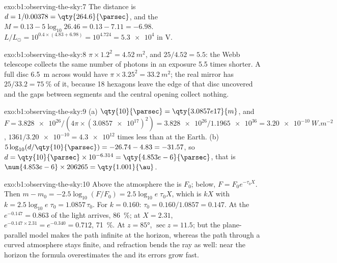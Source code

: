 \begin{solution}{exo:b1:observing-the-sky:7}
The distance is $d = 1/0.00378 = \qty{264.6}{\parsec}$, and the  $M = 0.13 - 5\log_{10}26.46 = 0.13 - 7.11 = -6.98$. $L/L_\odot = 10^{0.4\times(4.83 + 6.98)} =
10^{4.724} = \num{5.3e4}$ in V.
\end{solution}

\begin{solution}{exo:b1:observing-the-sky:8}
$\pi\times1.2^2 = \qty{4.52}{m^2}$, and $25/4.52 = 5.5$: the Webb telescope
collects the same number of photons in an exposure 5.5 times shorter. A full
disc \qty{6.5}{m} across would have $\pi\times3.25^2 = \qty{33.2}{m^2}$; the
real mirror has $25/33.2 = \qty{75}{\percent}$ of it, because 18 hexagons
leave the edge of that disc uncovered and the gaps between segments and the
central opening collect nothing.
\end{solution}

\begin{solution}{exo:b1:observing-the-sky:9}
(a) $\qty{10}{\parsec} = \qty{3.0857e17}{m}$, and $F = \num{3.828e26}/(4\pi
\times(\num{3.0857e17})^2) = \num{3.828e26}/\num{1.1965e36} =
\qty{3.20e-10}{W.m^{-2}}$, $1361/\num{3.20e-10} = \num{4.3e12}$ times less than at
the Earth.
(b) $5\log_{10}(d/\qty{10}{\parsec}) = -26.74 - 4.83 = -31.57$, so
$d = \qty{10}{\parsec}\times10^{-6.314} = \qty{4.853e-6}{\parsec}$, that is
$\num{4.853e-6}\times206265 = \qty{1.001}{\au}$.
\end{solution}

\begin{solution}{exo:b1:observing-the-sky:10}
Above the atmosphere the  is $F_0$; below, $F = F_0e^{-\tau_0X}$. Then
$m - m_0 = -2.5\log_{10}(F/F_0) = 2.5\log_{10}e\;\tau_0X$, which is $kX$ with
$k = 2.5\log_{10}e\;\tau_0 = 1.0857\,\tau_0$. For $k = 0.160$:
$\tau_0 = 0.160/1.0857 = 0.147$. At the  $e^{-0.147} = 0.863$ of the
light arrives, \qty{86}{\percent}; at $X = 2.31$, $e^{-0.147\times2.31} =
e^{-0.340} = 0.712$, \qty{71}{\percent}. At $z = \ang{85}$, $\sec z =
11.5$; but the plane-parallel model makes the path infinite at the horizon,
whereas the path through a curved atmosphere stays finite, and refraction
bends the ray as well: near the horizon the formula overestimates the
 and its errors grow fast.
\end{solution}


